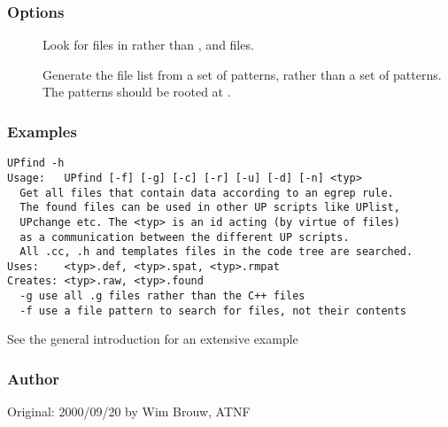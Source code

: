 \subsubsection*{Options}

\begin{description}
\item[]
    Look for files in  rather than ,  and
     files.
\item[]
    Generate the file list from a set of  patterns, rather than a
    set of  patterns. The  patterns should be rooted at
    . 
\end{description}

\subsubsection*{Examples}

\begin{verbatim}
UPfind -h
Usage:   UPfind [-f] [-g] [-c] [-r] [-u] [-d] [-n] <typ>
  Get all files that contain data according to an egrep rule.
  The found files can be used in other UP scripts like UPlist, 
  UPchange etc. The <typ> is an id acting (by virtue of files) 
  as a communication between the different UP scripts.
  All .cc, .h and templates files in the code tree are searched.
Uses:    <typ>.def, <typ>.spat, <typ>.rmpat
Creates: <typ>.raw, <typ>.found
  -g use all .g files rather than the C++ files
  -f use a file pattern to search for files, not their contents
\end{verbatim}

\noindent
See the general introduction for an extensive example 

\subsubsection*{Author}

Original: 2000/09/20 by Wim Brouw, ATNF


\newpage

\subsection{}
\label{UPlist}

